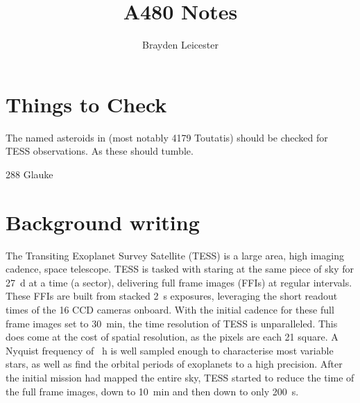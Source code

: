 \documentclass[12pt]{article}
\title{A480 Notes}
\author{Brayden Leicester}
\begin{document}
\maketitle

\section{Things to Check}
The named asteroids in \cite{Harris1994} (most notably 4179 Toutatis) should be checked for TESS observations. As these should tumble.

288 Glauke \cite{Harris2015}

\section{Background writing}

The Transiting Exoplanet Survey Satellite (TESS) \cite{Ricker2014} is a large area, high imaging cadence, space telescope. 
TESS is tasked with staring at the same piece of sky for \qty{27}{\day} at a time (a sector), delivering  full frame images (FFIs) at regular intervals. 
These FFIs are built from stacked \qty{2}{\second} exposures, leveraging the short readout times of the 16 CCD cameras onboard. 
With the initial cadence for these full frame images set to \qty{30}{\minute}, the time resolution of TESS is unparalleled. 
This does come at the cost of spatial resolution, as the pixels are each \qty{21}{\arcsec} square. 
A Nyquist frequency of \unit{\per\hour} is well sampled enough to characterise most variable stars, as well as find the orbital periods of exoplanets to a high precision. 
After the initial mission had mapped the entire sky, TESS started to reduce the time of the full frame images, down to \qty{10}{\minute} and then down to only \qty{200}{\second}.
\end{document}
